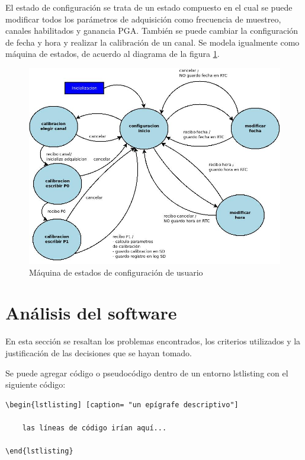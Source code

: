 El estado de configuración se trata de un estado compuesto en el cual se puede modificar todos los parámetros de adquisición como frecuencia de muestreo, canales habilitados y ganancia PGA. También se  puede cambiar la configuración de fecha y hora y realizar la calibración de un canal. Se modela igualmente como máquina de estados, de acuerdo al diagrama de la figura \ref{fig:VOP24_configuracion_v1}.

\begin{figure}[!htbp]
	\centering
	\includegraphics[width=\textwidth]{./Figures/VOP24_configuracion_v1.jpeg}
	\caption{Máquina de estados de configuración de usuario}
	\label{fig:VOP24_configuracion_v1}
\end{figure}

\section{Análisis del software}
 
En esta sección se resaltan los problemas encontrados, los criterios utilizados y la justificación de las decisiones que se hayan tomado.

Se puede agregar código o pseudocódigo dentro de un entorno lstlisting con el siguiente código:

\begin{verbatim}
\begin{lstlisting] [caption= "un epígrafe descriptivo"]

	las líneas de código irían aquí...
	
\end{lstlisting}
\end{verbatim}

